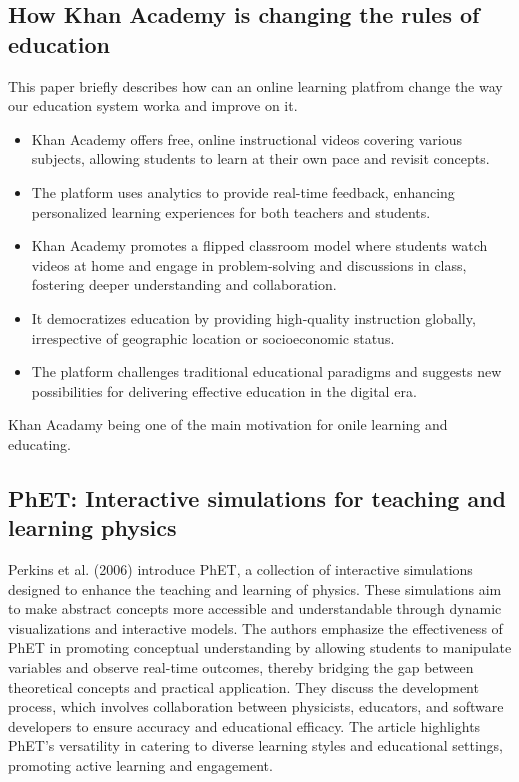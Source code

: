 \subsection*{How Khan Academy is changing the rules of education}
This paper briefly describes how can an online learning platfrom change the way our education system worka and improve on it.
\begin{itemize}
    \item Khan Academy offers free, online instructional videos covering various subjects, allowing students to learn at their own pace and revisit concepts.
    
    \item The platform uses analytics to provide real-time feedback, enhancing personalized learning experiences for both teachers and students.
    
    \item Khan Academy promotes a flipped classroom model where students watch videos at home and engage in problem-solving and discussions in class, fostering deeper understanding and collaboration.
    
    \item It democratizes education by providing high-quality instruction globally, irrespective of geographic location or socioeconomic status.
    
    \item The platform challenges traditional educational paradigms and suggests new possibilities for delivering effective education in the digital era.
\end{itemize}
Khan Acadamy being one of the main motivation for onile learning and educating.
\cite{thompson2011khan}
\subsection*{PhET: Interactive simulations for teaching and learning physics}
Perkins et al. (2006) introduce PhET, a collection of interactive simulations designed to enhance the teaching and learning of physics. These simulations aim to make abstract concepts more accessible and understandable through dynamic visualizations and interactive models. The authors emphasize the effectiveness of PhET in promoting conceptual understanding by allowing students to manipulate variables and observe real-time outcomes, thereby bridging the gap between theoretical concepts and practical application. They discuss the development process, which involves collaboration between physicists, educators, and software developers to ensure accuracy and educational efficacy. The article highlights PhET's versatility in catering to diverse learning styles and educational settings, promoting active learning and engagement. \cite{perkins2006phet}

